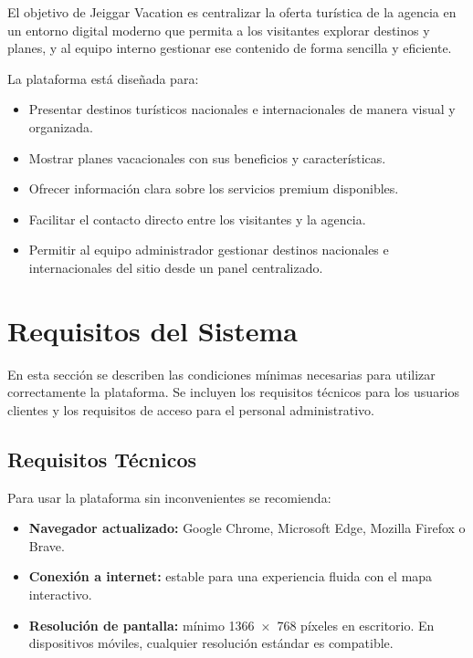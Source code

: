 \documentclass[12pt,letterpaper]{article}
\begin{document}
El objetivo de Jeiggar Vacation es centralizar la oferta turística de la agencia en un entorno digital moderno que permita a los visitantes explorar destinos y planes, y al equipo interno gestionar ese contenido de forma sencilla y eficiente.

La plataforma está diseñada para:

\begin{itemize}
    \item Presentar destinos turísticos nacionales e internacionales de manera visual y organizada.
    \item Mostrar planes vacacionales con sus beneficios y características.
    \item Ofrecer información clara sobre los servicios premium disponibles.
    \item Facilitar el contacto directo entre los visitantes y la agencia.
    \item Permitir al equipo administrador gestionar destinos nacionales e internacionales del sitio desde un panel centralizado.
\end{itemize}

\section{Requisitos del Sistema}

En esta sección se describen las condiciones mínimas necesarias para utilizar correctamente la plataforma. Se incluyen los requisitos técnicos para los usuarios clientes y los requisitos de acceso para el personal administrativo.

\subsection{Requisitos Técnicos}

Para usar la plataforma sin inconvenientes se recomienda:

\begin{itemize}
    \item \textbf{Navegador actualizado:} Google Chrome, Microsoft Edge, Mozilla Firefox o Brave.
    \item \textbf{Conexión a internet:} estable para una experiencia fluida con el mapa interactivo.
    \item \textbf{Resolución de pantalla:} mínimo 1366~×~768 píxeles en escritorio. En dispositivos móviles, cualquier resolución estándar es compatible.
\end{itemize}
\end{document}
